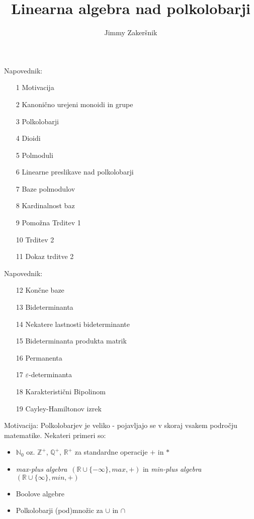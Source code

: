 \documentclass[t, 11pt]{beamer} %
\title{Linearna algebra nad polkolobarji}
\author{Jimmy Zakeršnik}
\institute{mentor: prof. dr. Tomaž Košir}
\newcommand{\mth}[1]{\ensuremath{\mathbb{#1}}}
\newcommand{\R}{\mth{R}}
\newcommand{\Pplus}[1]{\mth{#1}^{+}}
\newcommand{\No}{\mth{N}_0}
\newcommand{\pojem}[1]{\emph{#1}}
\newcommand{\fillblack}[1]{
\begin{tikzpicture}[remember picture, overlay]
    \node [shift={(0 cm,0cm)}]  at (current page.south west)
        {%
        \begin{tikzpicture}[remember picture, overlay] at (current page.south west)
            \draw [fill=black] (0, 0) -- (0,#1 \paperheight) --
                              (\paperwidth,#1 \paperheight) -- (\paperwidth,0) -- cycle ;
        \end{tikzpicture}
        };
        \draw (current page.north west) rectangle (current page.south east);
\end{tikzpicture}
}
\begin{document}
\begin{frame}
  \maketitle
\end{frame}

\begin{frame}{Napovednik:}
	\begin{enumerate}
		\item[1] Motivacija
		\item[2] Kanonično urejeni monoidi in grupe
		\item[3] Polkolobarji
		\item[4] Dioidi
		\item[5] Polmoduli
		\item[6] Linearne preslikave nad polkolobarji
		\item[7] Baze polmodulov
		\item[8] Kardinalnost baz
		\item[9] Pomožna Trditev 1
		\item[10] Trditev 2
		\item[11] Dokaz trditve 2
	\end{enumerate}
\end{frame}
\begin{frame}{Napovednik:}
\begin{enumerate}
		\item[12] Končne baze
		\item[13] Bideterminanta
		\item[14] Nekatere lastnosti bideterminante
		\item[15] Bideterminanta produkta matrik
		\item[16] Permanenta
		\item[17] $\varepsilon$-determinanta
		\item[18] Karakteristični Bipolinom
		\item[19] Cayley-Hamiltonov izrek
	\end{enumerate}

\end{frame}

\begin{frame}{Motivacija:}
  Polkolobarjev je veliko - pojavljajo se v skoraj vsakem področju matematike. Nekateri primeri so:
  \begin{itemize}
    \item $\No$ oz. $\Pplus{Z}$, $\Pplus{Q}$, $\Pplus{R}$ za standardne operacije $+$ in $*$
    \item \pojem{max-plus algebra}~$(\R\cup\{-\infty\}, max, +)$ in \pojem{min-plus algebra}~$(\R\cup\{\infty\}, min, +)$
    \item Boolove algebre
    \item Polkolobarji (pod)množic za $\cup$ in $\cap$
  \end{itemize}

\end{frame}
\end{document}
